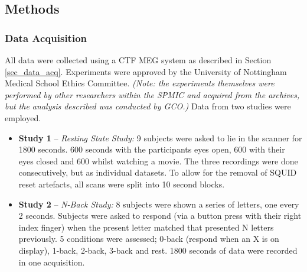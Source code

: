 \subsection{Methods}
\subsubsection{Data Acquisition}
All data were collected using a CTF MEG system as described in Section \ref{sec_data_acq}. Experiments were approved by the University of Nottingham Medical School Ethics Committee. \textit{(Note: the experiments themselves were performed by other researchers within the SPMIC and acquired from the archives, but the analysis described was conducted by GCO.)} Data from two studies were employed. 

\begin{itemize}
\item \textbf{Study 1} -- \textit{Resting State Study:} 9 subjects were asked to lie in the scanner for 1800 seconds. 600 seconds with the participants eyes open, 600 with their eyes closed and 600 whilst watching a movie. The three recordings were done consecutively, but as individual datasets. To allow for the removal of SQUID reset artefacts, all scans were split into 10 second blocks. 
\item \textbf{Study 2} -- \textit{N-Back Study:} 8 subjects were shown a series of letters, one every 2 seconds. Subjects were asked to respond (via a button press with their right index finger) when the present letter matched that presented N letters previously. 5 conditions were assessed; 0-back (respond when an X is on display), 1-back, 2-back, 3-back and rest. 1800 seconds of data were recorded in one acquisition.
\end{itemize}

